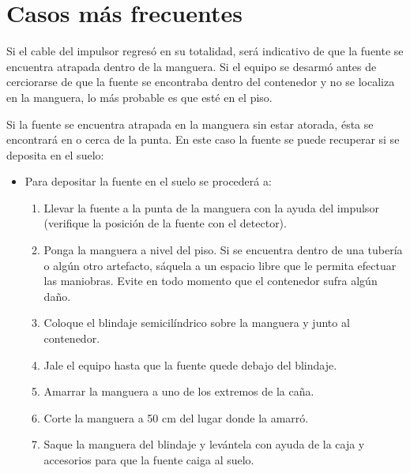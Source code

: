 
\section*{Casos más frecuentes}
Si el cable del impulsor regresó en su totalidad, será indicativo de que la fuente se encuentra atrapada dentro de la manguera. Si el equipo se desarmó antes de cerciorarse de que la fuente se encontraba dentro del contenedor y no se localiza en la manguera, lo más probable es que esté en el piso.

Si la fuente se encuentra atrapada en la manguera sin estar atorada, ésta se encontrará en o cerca de la punta. En este caso la fuente se puede recuperar si se deposita en el suelo:

\begin{itemize}
    \item Para depositar la fuente en el suelo se procederá a:
    \begin{enumerate}
        \item Llevar la fuente a la punta de la manguera con la ayuda del impulsor (verifique la posición de la fuente con el detector).
        \item Ponga la manguera a nivel del piso. Si se encuentra dentro de una tubería o algún otro artefacto, sáquela a un espacio libre que le permita efectuar las maniobras. Evite en todo momento que el contenedor sufra algún daño.
        \item Coloque el blindaje semicilíndrico sobre la manguera y junto al contenedor.
        \item Jale el equipo hasta que la fuente quede debajo del blindaje.
        \item Amarrar la manguera a uno de los extremos de la caña.
        \item Corte la manguera a 50 cm del lugar donde la amarró.
        \item Saque la manguera del blindaje y levántela con ayuda de la caja y accesorios para que la fuente caiga al suelo.
    \end{enumerate}
\end{itemize}
